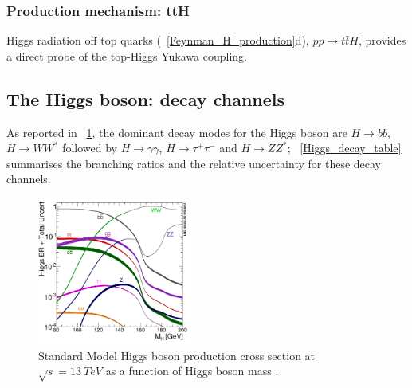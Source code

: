 \subsubsection{Production mechanism: ttH}
Higgs radiation off top quarks (\figurename~\ref{Feynman_H_production}d), $pp \to t\bar{t}H$, provides a direct probe of the top-Higgs Yukawa coupling.

\subsection{The Higgs boson: decay channels}
As reported in \figurename~\ref{Higgs_decay}, the dominant decay modes for the Higgs boson are $H \to b\bar{b}$, $H \to WW^{*}$ followed by $H \to \gamma \gamma$, $H \to \tau^{+}\tau^{-}$ and $H \to ZZ^{*}$;  \tablename~\ref{Higgs_decay_table} summarises the branching ratios and the relative uncertainty for these decay channels.
\begin{figure}[htbp]
\centering
\includegraphics[width=0.45\textwidth]{Images/Higgs_decay}
\caption{Standard Model Higgs boson production cross section at $\sqrt{s} = 13\ TeV$ as a function of Higgs boson mass \cite{HiggsProduction}.}
\label{Higgs_decay}
\end{figure}
